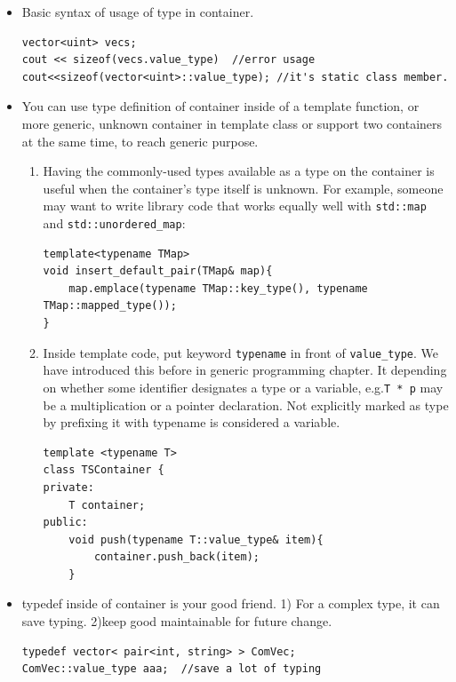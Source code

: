 \documentclass[a4paper,11pt,twoside]{book}
\begin{document}
\begin{itemize}
	\item Basic syntax of usage of type in container.
\begin{lstlisting}[numbers=none]
vector<uint> vecs;
cout << sizeof(vecs.value_type)  //error usage
cout<<sizeof(vector<uint>::value_type); //it's static class member.
\end{lstlisting}

	\item You can use type definition of container inside of a template function, or more generic, unknown container in template class or support two containers at the same time, to reach generic purpose.
	
\begin{enumerate}
	
	\item Having the commonly-used types available as a type on the container is useful when the container's type itself is unknown. For example, someone may want to write library code that works equally well with \texttt{std::map} and \texttt{std::unordered\_map}:
\begin{lstlisting}[numbers=none]
template<typename TMap>
void insert_default_pair(TMap& map){
    map.emplace(typename TMap::key_type(), typename TMap::mapped_type());
}
\end{lstlisting}

	\item Inside template code, put keyword \texttt{typename} in front of \texttt{value\_type}. We have introduced this before in generic programming chapter. It depending on whether some identifier designates a type or a variable, e.g.\texttt{T * p} may be a multiplication or a pointer declaration. Not explicitly marked as type by prefixing it with typename is considered a variable.

\begin{lstlisting}[numbers=none]
template <typename T>
class TSContainer {
private:
	T container;
public:
	void push(typename T::value_type& item){
		container.push_back(item);
	}
\end{lstlisting}

\end{enumerate}

	\item typedef inside of container is your good friend. 1) For a complex type, it can save typing. 2)keep good maintainable for future change. 
\begin{lstlisting}
typedef vector< pair<int, string> > ComVec;
ComVec::value_type aaa;  //save a lot of typing 


\end{lstlisting}
\end{itemize}
\end{document}
